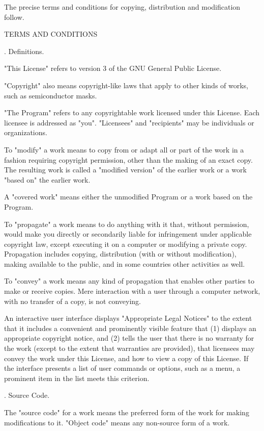 The precise terms and conditions for copying, distribution and
modification follow.

\vparasmall
TERMS AND CONDITIONS

. Definitions.

"This License" refers to version 3 of the GNU General Public License.

"Copyright" also means copyright-like laws that apply to other kinds of
works, such as semiconductor masks.

"The Program" refers to any copyrightable work licensed under this
License.  Each licensee is addressed as "you".  "Licensees" and
"recipients" may be individuals or organizations.

To "modify" a work means to copy from or adapt all or part of the work
in a fashion requiring copyright permission, other than the making of an
exact copy.  The resulting work is called a "modified version" of the
earlier work or a work "based on" the earlier work.

A "covered work" means either the unmodified Program or a work based
on the Program.

To "propagate" a work means to do anything with it that, without
permission, would make you directly or secondarily liable for
infringement under applicable copyright law, except executing it on a
computer or modifying a private copy.  Propagation includes copying,
distribution (with or without modification), making available to the
public, and in some countries other activities as well.

To "convey" a work means any kind of propagation that enables other
parties to make or receive copies.  Mere interaction with a user through
a computer network, with no transfer of a copy, is not conveying.

An interactive user interface displays "Appropriate Legal Notices"
to the extent that it includes a convenient and prominently visible
feature that (1) displays an appropriate copyright notice, and (2)
tells the user that there is no warranty for the work (except to the
extent that warranties are provided), that licensees may convey the
work under this License, and how to view a copy of this License.  If
the interface presents a list of user commands or options, such as a
menu, a prominent item in the list meets this criterion.

. Source Code.

The "source code" for a work means the preferred form of the work
for making modifications to it.  "Object code" means any non-source
form of a work.

